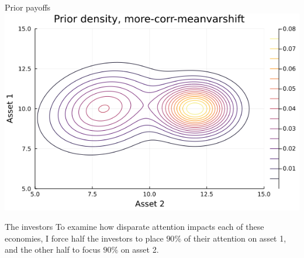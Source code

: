 \documentclass[
  ignorenonframetext,
]{beamer}
\begin{document}
\begin{frame}{Prior payoffs}
\includegraphics[width=0.5\paperheight]{complexity_files/figure-beamer/unnamed-chunk-10-4}
\end{frame}

\begin{frame}{The investors}
\protect\hypertarget{the-investors-1}{}
To examine how disparate attention impacts each of these economies, I
force half the investors to place \(90\%\) of their attention on asset
1, and the other half to focus \(90\%\) on asset 2.
\end{frame}
\end{document}
